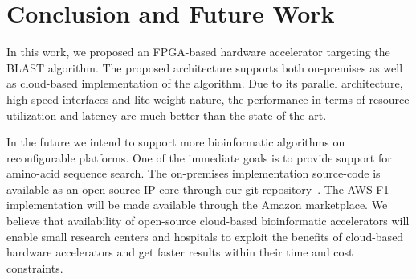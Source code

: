 \section{Conclusion and Future Work}
\label{sec:concl}

In this work, we proposed an FPGA-based hardware accelerator targeting the BLAST algorithm. 
The proposed architecture supports both on-premises as well as cloud-based implementation of the algorithm.
Due to its parallel architecture, high-speed interfaces and lite-weight nature, the performance in terms of resource utilization and latency are much better than the state of the art.

In the future we intend to support more bioinformatic algorithms on reconfigurable platforms.
One of the immediate goals is to provide support for amino-acid sequence search.
The on-premises implementation source-code is available as an open-source IP core through our git repository~\cite{hblastGit}.
The AWS F1 implementation will be made available through the Amazon marketplace.
We believe that availability of open-source cloud-based bioinformatic accelerators will enable small research centers and hospitals to exploit the benefits of cloud-based hardware accelerators and get faster results within their time and cost constraints.